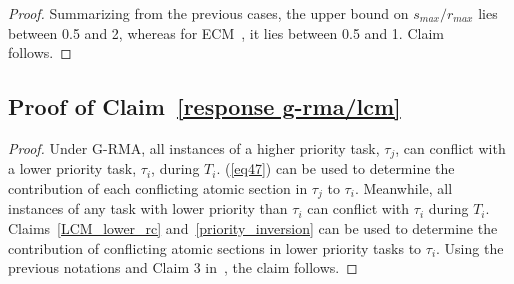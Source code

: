 \documentclass[letter]{sig-alternate}
\begin{document}
\begin{proof}
Summarizing from the previous cases, the upper bound on $s_{max}/r_{max}$
lies between 0.5 and 2, whereas for ECM~\cite{stmconcurrencycontrol:emsoft11},
it lies between 0.5 and 1. Claim follows.

\end{proof}
\subsection{\label{proof_response g-rma/lcm}Proof of Claim~\ref{response g-rma/lcm}}
\begin{proof}
Under G-RMA, all instances of a higher priority task, $\tau_{j}$, can conflict with a lower priority task,
$\tau_{i}$, during $T_{i}$. (\ref{eq47}) can be used to determine the contribution of each conflicting atomic section in $\tau_j$ to $\tau_i$. Meanwhile, all instances of any task with lower priority than $\tau_{i}$ can conflict with $\tau_i$ during $T_{i}$. Claims~\ref{LCM_lower_rc} and~\ref{priority_inversion} can be used to determine the contribution of conflicting atomic sections in lower priority tasks to $\tau_i$.
%
Using the previous notations and Claim 3 in~\cite{stmconcurrencycontrol:emsoft11}, the claim follows.
\end{proof}
\end{document}
